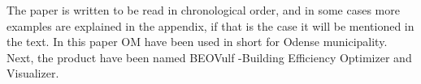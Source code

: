 The paper is written to be read in chronological order, and in some cases more examples are explained in the appendix, if that is the case it will be mentioned in the text.
In this paper OM have been used in short for Odense municipality. Next, the product have been named BEOVulf  -Building Efficiency Optimizer and Visualizer.